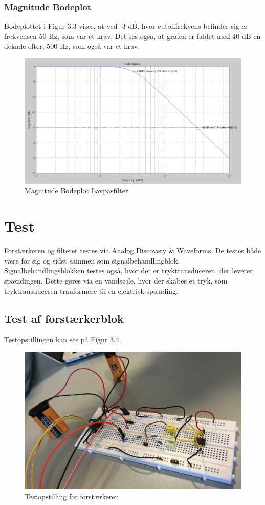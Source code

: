 \subsubsection{Magnitude Bodeplot}
Bodeplottet i Figur 3.3 viser, at ved -3 dB, hvor cutofffrekvens befinder sig er frekvensen 50 Hz, som var et krav. Det ses også, at grafen er faldet med 40 dB en dekade efter, 500 Hz, som også var et krav.   
\begin{figure}[H]
	\centering
	\includegraphics[width=1\textwidth]{Figurer/Bodeplot_Lavpasfilter_Teoretisk}
	\caption{Magnitude Bodeplot Lavpasfilter}
	\label{fig:Bodeplot}
\end{figure}

\section{Test}
Forstærkeren og filteret testes via Analog Discovery \& Waveforms. De testes både være for sig og sidst sammen som signalbehandlingblok.\\
Signalbehandlingsblokken testes også, hvor det er tryktransduceren, der leverer spændingen. Dette gøres via en vandsøjle, hvor der skabes et tryk, som tryktransduceren tranformere til en elektrisk spænding.  

\subsection{Test af forstærkerblok}
Testopstillingen kan ses på Figur 3.4. 

\begin{figure}[H]
	\centering
	\includegraphics[width=1\textwidth]{Figurer/Snip20151202_20}
	\caption{Testopstilling for forstærkeren}
\end{figure}

